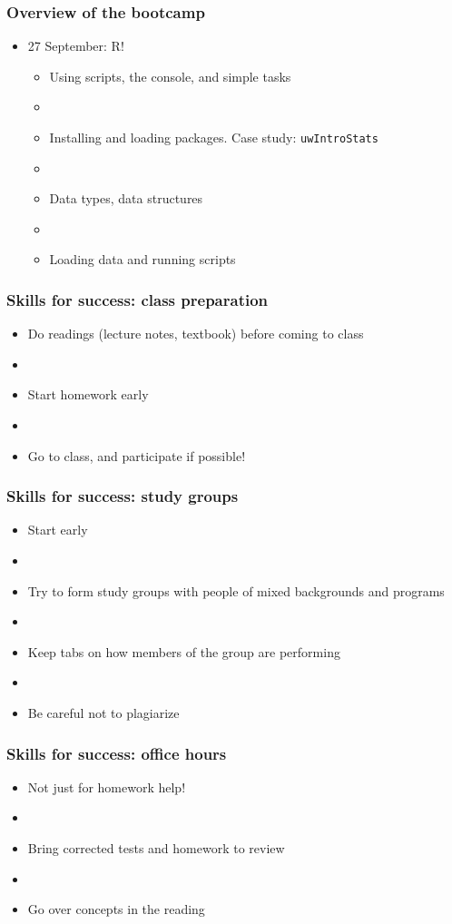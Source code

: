 \documentclass[12pt]{beamer}
\newcommand{\myframe}[1]{\begin{frame} \frametitle{#1}}
\begin{document}
\myframe{Overview of the bootcamp}
\begin{itemize}
\item 27 September: R!
\begin{itemize}
\item Using scripts, the console, and simple tasks
\item[]
\item Installing and loading packages. Case study: \texttt{uwIntroStats}
\item[]
\item Data types, data structures
\item[]
\item Loading data and running scripts
\end{itemize}
\end{itemize}
\end{frame}

\myframe{Skills for success: class preparation}
\begin{itemize}
\item Do readings (lecture notes, textbook) before coming to class
\item[]
\item Start homework early
\item[]
\item Go to class, and participate if possible!
\end{itemize}
\end{frame}

\myframe{Skills for success: study groups}
\begin{itemize}
\item Start early
\item[]
\item Try to form study groups with people of mixed backgrounds and programs
\item[]
\item Keep tabs on how members of the group are performing
\item[]
\item Be careful not to plagiarize
\end{itemize}
\end{frame}

\myframe{Skills for success: office hours}
\begin{itemize}
\item Not just for homework help!
\item[]
\item Bring corrected tests and homework to review
\item[]
\item Go over concepts in the reading
\end{itemize}
\end{frame}
\end{document}
